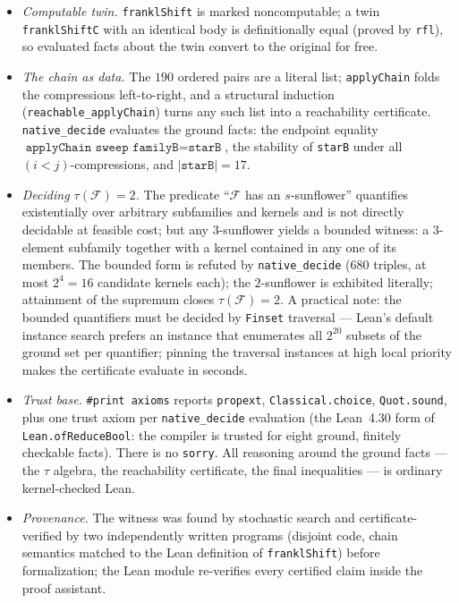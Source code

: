 \documentclass[11pt,a4paper]{article}
\theoremstyle{remark}
\newcommand{\cF}{\mathcal{F}}
\begin{document}
\begin{itemize}
\item \emph{Computable twin.} \texttt{franklShift} is marked
noncomputable; a twin \texttt{franklShiftC} with an identical body is
definitionally equal (proved by \texttt{rfl}), so evaluated facts about
the twin convert to the original for free.
\item \emph{The chain as data.} The $190$ ordered pairs are a literal
list; \texttt{applyChain} folds the compressions left-to-right, and a
structural induction (\texttt{reachable\_applyChain}) turns any such
list into a reachability certificate. \texttt{native\_decide}
evaluates the ground facts: the endpoint equality
$\texttt{applyChain sweep familyB}=\texttt{starB}$, the stability of
\texttt{starB} under all $(i<j)$-compressions, and
$|\texttt{starB}|=17$.
\item \emph{Deciding $\tau(\cF)=2$.} The predicate ``$\cF$ has an
$s$-sunflower'' quantifies existentially over arbitrary subfamilies
and kernels and is not directly decidable at feasible cost; but any
$3$-sunflower yields a bounded witness: a $3$-element subfamily
together with a kernel contained in any one of its members. The
bounded form is refuted by \texttt{native\_decide} ($680$ triples,
at most $2^{4}=16$ candidate kernels each); the $2$-sunflower is
exhibited literally; attainment of the supremum closes
$\tau(\cF)=2$. A practical note: the bounded quantifiers must be
decided by \texttt{Finset} traversal --- Lean's default instance
search prefers an instance that enumerates all $2^{20}$ subsets of the
ground set per quantifier; pinning the traversal instances at high
local priority makes the certificate evaluate in seconds.
\item \emph{Trust base.} \texttt{\#print axioms} reports
\texttt{propext}, \texttt{Classical.choice}, \texttt{Quot.sound},
plus one trust axiom per \texttt{native\_decide} evaluation (the
Lean~4.30 form of \texttt{Lean.ofReduceBool}: the compiler is trusted
for eight ground, finitely checkable facts). There is no
\texttt{sorry}. All reasoning around the ground facts --- the $\tau$
algebra, the reachability certificate, the final inequalities --- is
ordinary kernel-checked Lean.
\item \emph{Provenance.} The witness was found by stochastic search
and certificate-verified by two independently written programs
(disjoint code, chain semantics matched to the Lean definition of
\texttt{franklShift}) before formalization; the Lean module
re-verifies every certified claim inside the proof assistant.
\end{itemize}
\end{document}
